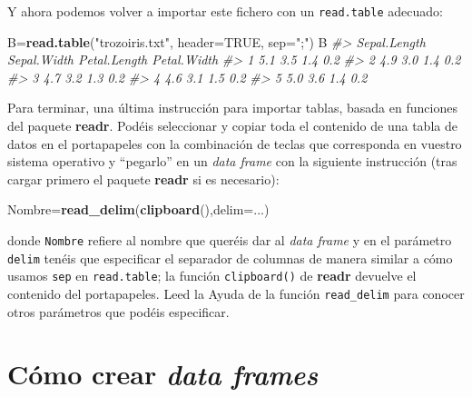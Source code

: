 \documentclass[
]{book}
\newenvironment{Shaded}{\begin{snugshade}}{\end{snugshade}}
\newcommand{\CommentTok}[1]{\textcolor[rgb]{0.56,0.35,0.01}{\textit{#1}}}
\newcommand{\DataTypeTok}[1]{\textcolor[rgb]{0.13,0.29,0.53}{#1}}
\newcommand{\KeywordTok}[1]{\textcolor[rgb]{0.13,0.29,0.53}{\textbf{#1}}}
\newcommand{\NormalTok}[1]{#1}
\newcommand{\OtherTok}[1]{\textcolor[rgb]{0.56,0.35,0.01}{#1}}
\newcommand{\StringTok}[1]{\textcolor[rgb]{0.31,0.60,0.02}{#1}}
\theoremstyle{definition}
\theoremstyle{definition}
\theoremstyle{definition}
\theoremstyle{remark}
\begin{document}
Y ahora podemos volver a importar este fichero con un \texttt{read.table} adecuado:

\begin{Shaded}
\begin{Highlighting}[]
\NormalTok{B=}\KeywordTok{read.table}\NormalTok{(}\StringTok{"trozoiris.txt"}\NormalTok{, }\DataTypeTok{header=}\OtherTok{TRUE}\NormalTok{, }\DataTypeTok{sep=}\StringTok{";"}\NormalTok{)}
\NormalTok{B}
\CommentTok{\#\textgreater{}   Sepal.Length Sepal.Width Petal.Length Petal.Width}
\CommentTok{\#\textgreater{} 1          5.1         3.5          1.4         0.2}
\CommentTok{\#\textgreater{} 2          4.9         3.0          1.4         0.2}
\CommentTok{\#\textgreater{} 3          4.7         3.2          1.3         0.2}
\CommentTok{\#\textgreater{} 4          4.6         3.1          1.5         0.2}
\CommentTok{\#\textgreater{} 5          5.0         3.6          1.4         0.2}
\end{Highlighting}
\end{Shaded}

Para terminar, una última instrucción para importar tablas, basada en funciones del paquete \textbf{readr}. Podéis seleccionar y copiar toda el contenido de una tabla de datos en el portapapeles con la combinación de teclas que corresponda en vuestro sistema operativo y ``pegarlo'' en un \emph{data frame} con la siguiente instrucción (tras cargar primero el paquete \textbf{readr} si es necesario):

\begin{Shaded}
\begin{Highlighting}[]
\NormalTok{Nombre=}\KeywordTok{read\_delim}\NormalTok{(}\KeywordTok{clipboard}\NormalTok{(),}\DataTypeTok{delim=}\NormalTok{...)}
\end{Highlighting}
\end{Shaded}

donde \texttt{Nombre} refiere al nombre que queréis dar al \emph{data frame} y en el parámetro \texttt{delim} tenéis que especificar el separador de columnas de manera similar a cómo usamos \texttt{sep} en \texttt{read.table}; la función \texttt{clipboard()} de \textbf{readr} devuelve el contenido del portapapeles. Leed la Ayuda de la función \texttt{read\_delim} para conocer otros parámetros que podéis especificar.

\hypertarget{cuxf3mo-crear-data-frames}{%
\section{\texorpdfstring{Cómo crear \emph{data frames}}{Cómo crear data frames}}\label{cuxf3mo-crear-data-frames}}
\end{document}
